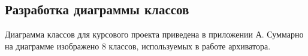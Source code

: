 \subsection{Разработка диаграммы классов}

Диаграмма классов для курсового проекта приведена в приложении А.
Суммарно на диаграмме изображено 8 классов, используемых в работе архиватора.